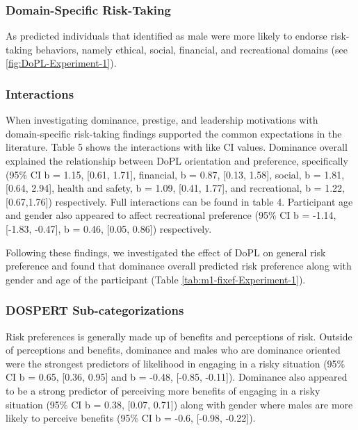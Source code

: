 \documentclass[
  donotrepeattitle,doc, 12pt, a4paper,floatsintext]{apa7}
\begin{document}
\hypertarget{domain-specific-risk-taking}{%
\subsubsection{Domain-Specific Risk-Taking}\label{domain-specific-risk-taking}}

As predicted individuals that identified as male were more likely to endorse risk-taking behaviors, namely ethical, social, financial, and recreational domains (see \ref{fig:DoPL-Experiment-1}).

\hypertarget{interactions}{%
\subsubsection{Interactions}\label{interactions}}

When investigating dominance, prestige, and leadership motivations with domain-specific risk-taking findings supported the common expectations in the literature. Table 5 shows the interactions with like CI values. Dominance overall explained the relationship between DoPL orientation and preference, specifically (95\% CI b = 1.15, {[}0.61, 1.71{]}, financial, b = 0.87, {[}0.13, 1.58{]}, social, b = 1.81, {[}0.64, 2.94{]}, health and safety, b = 1.09, {[}0.41, 1.77{]}, and recreational, b = 1.22, {[}0.67,1.76{]}) respectively. Full interactions can be found in table 4. Participant age and gender also appeared to affect recreational preference (95\% CI b = -1.14, {[}-1.83, -0.47{]}, b = 0.46, {[}0.05, 0.86{]}) respectively.

Following these findings, we investigated the effect of DoPL on general risk preference and found that dominance overall predicted risk preference along with gender and age of the participant (Table \ref{tab:m1-fixef-Experiment-1}).

\hypertarget{dospert-sub-categorizations}{%
\subsubsection{DOSPERT Sub-categorizations}\label{dospert-sub-categorizations}}

Risk preferences is generally made up of benefits and perceptions of risk. Outside of perceptions and benefits, dominance and males who are dominance oriented were the strongest predictors of likelihood in engaging in a risky situation (95\% CI b = 0.65, {[}0.36, 0.95{]} and b = -0.48, {[}-0.85, -0.11{]}). Dominance also appeared to be a strong predictor of perceiving more benefits of engaging in a risky situation (95\% CI b = 0.38, {[}0.07, 0.71{]}) along with gender where males are more likely to perceive benefits (95\% CI b = -0.6, {[}-0.98, -0.22{]}).
\end{document}
